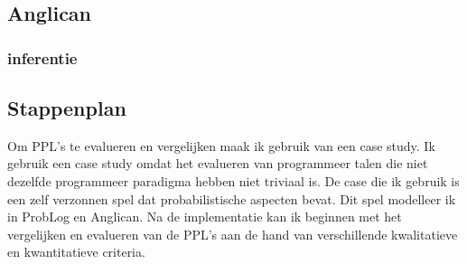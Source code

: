 \documentclass[12pt,a4paper,oneside]{book}
\begin{document}
\subsection{Anglican}
\label{subsec:anglican}
\subsubsection{inferentie}

\subsection{Stappenplan}
Om PPL's te evalueren en vergelijken maak ik gebruik van een case study. Ik gebruik een case study omdat het evalueren van programmeer talen die niet dezelfde programmeer paradigma hebben niet triviaal is. De case die ik gebruik is een zelf verzonnen spel dat probabilistische aspecten bevat. Dit spel modelleer ik in ProbLog en Anglican. Na de implementatie kan ik beginnen met het vergelijken en evalueren van de PPL's aan de hand van verschillende kwalitatieve en kwantitatieve criteria.
\end{document}
